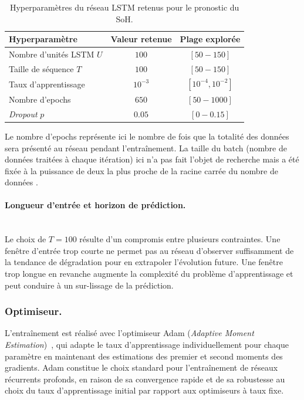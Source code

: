 \begin{table}[h!]
    \centering
    \caption{Hyperparamètres du réseau LSTM retenus pour le pronostic du SoH. \vspace{0.2cm}}
    \label{tab:hyperparameters}
    \begin{tabular}{lcc}
        \hline
        \textbf{Hyperparamètre} & \textbf{Valeur retenue} & \textbf{Plage explorée} \\
        \hline
        Nombre d'unités LSTM $U$     & $100 $              & $[50-150]  $          \\
        Taille de séquence $T$       & $100$  & $[50-150]$   \\
        Taux d'apprentissage        & $10^{-3}$        & $[10^{-4},10^{-2}]$ \\
        Nombre d'epochs           & $650  $            & $[50-1000] $        \\
        \textit{Dropout}  $p$          & $0.05$               & $[0-0.15]$ \\
        \hline
    \end{tabular}
\end{table}
Le nombre d'epochs représente ici le nombre de fois que la totalité des données sera présenté au réseau pendant l'entraînement. La taille du batch (nombre de données traitées à chaque itération) ici n'a pas fait l'objet de recherche mais a été fixée à la puissance de deux la plus proche de la racine carrée du nombre de données \cite{chanal_diagnosis_2024}.

\paragraph{Longueur d'entrée et horizon de prédiction.}\hfill \\
Le choix de $T= 100$ résulte d'un compromis entre plusieurs contraintes. Une fenêtre d'entrée trop courte ne permet pas au réseau d'observer suffisamment de la tendance de dégradation pour en extrapoler l'évolution future. Une fenêtre trop longue en revanche augmente la complexité du problème d'apprentissage et peut conduire à un sur-lissage de la prédiction. 

\subsubsection{Optimiseur.}
L'entraînement est réalisé avec l'optimiseur Adam (\textit{Adaptive Moment Estimation})~\cite{kingma_adam_2017}, qui adapte le taux d'apprentissage individuellement pour chaque paramètre en maintenant des estimations des premier et second moments des gradients. Adam constitue le choix standard pour l'entraînement de réseaux récurrents profonds, en raison de sa convergence rapide et de sa robustesse au choix du taux d'apprentissage initial par rapport aux optimiseurs à taux fixe.

